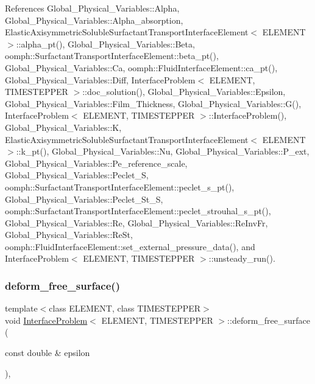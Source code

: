 References Global\+\_\+\+Physical\+\_\+\+Variables\+::\+Alpha, Global\+\_\+\+Physical\+\_\+\+Variables\+::\+Alpha\+\_\+absorption, Elastic\+Axisymmetric\+Soluble\+Surfactant\+Transport\+Interface\+Element$<$ E\+L\+E\+M\+E\+N\+T $>$\+::alpha\+\_\+pt(), Global\+\_\+\+Physical\+\_\+\+Variables\+::\+Beta, oomph\+::\+Surfactant\+Transport\+Interface\+Element\+::beta\+\_\+pt(), Global\+\_\+\+Physical\+\_\+\+Variables\+::\+Ca, oomph\+::\+Fluid\+Interface\+Element\+::ca\+\_\+pt(), Global\+\_\+\+Physical\+\_\+\+Variables\+::\+Diff, Interface\+Problem$<$ E\+L\+E\+M\+E\+N\+T, T\+I\+M\+E\+S\+T\+E\+P\+P\+E\+R $>$\+::doc\+\_\+solution(), Global\+\_\+\+Physical\+\_\+\+Variables\+::\+Epsilon, Global\+\_\+\+Physical\+\_\+\+Variables\+::\+Film\+\_\+\+Thickness, Global\+\_\+\+Physical\+\_\+\+Variables\+::\+G(), Interface\+Problem$<$ E\+L\+E\+M\+E\+N\+T, T\+I\+M\+E\+S\+T\+E\+P\+P\+E\+R $>$\+::\+Interface\+Problem(), Global\+\_\+\+Physical\+\_\+\+Variables\+::K, Elastic\+Axisymmetric\+Soluble\+Surfactant\+Transport\+Interface\+Element$<$ E\+L\+E\+M\+E\+N\+T $>$\+::k\+\_\+pt(), Global\+\_\+\+Physical\+\_\+\+Variables\+::\+Nu, Global\+\_\+\+Physical\+\_\+\+Variables\+::\+P\+\_\+ext, Global\+\_\+\+Physical\+\_\+\+Variables\+::\+Pe\+\_\+reference\+\_\+scale, Global\+\_\+\+Physical\+\_\+\+Variables\+::\+Peclet\+\_\+S, oomph\+::\+Surfactant\+Transport\+Interface\+Element\+::peclet\+\_\+s\+\_\+pt(), Global\+\_\+\+Physical\+\_\+\+Variables\+::\+Peclet\+\_\+\+St\+\_\+S, oomph\+::\+Surfactant\+Transport\+Interface\+Element\+::peclet\+\_\+strouhal\+\_\+s\+\_\+pt(), Global\+\_\+\+Physical\+\_\+\+Variables\+::\+Re, Global\+\_\+\+Physical\+\_\+\+Variables\+::\+Re\+Inv\+Fr, Global\+\_\+\+Physical\+\_\+\+Variables\+::\+Re\+St, oomph\+::\+Fluid\+Interface\+Element\+::set\+\_\+external\+\_\+pressure\+\_\+data(), and Interface\+Problem$<$ E\+L\+E\+M\+E\+N\+T, T\+I\+M\+E\+S\+T\+E\+P\+P\+E\+R $>$\+::unsteady\+\_\+run().

\mbox{\label{classInterfaceProblem_a4514af9aa19dd50d10ca18f12039428f}} 
\subsubsection{\texorpdfstring{deform\+\_\+free\+\_\+surface()}{deform\_free\_surface()}\hspace{0.1cm}{\footnotesize\ttfamily [2/2]}}
{\footnotesize\ttfamily template$<$class E\+L\+E\+M\+E\+NT, class T\+I\+M\+E\+S\+T\+E\+P\+P\+ER$>$ \\
void \hyperlink{classInterfaceProblem}{Interface\+Problem}$<$ E\+L\+E\+M\+E\+NT, T\+I\+M\+E\+S\+T\+E\+P\+P\+ER $>$\+::deform\+\_\+free\+\_\+surface (\begin{DoxyParamCaption}\item[{const double \&}]{epsilon }\end{DoxyParamCaption})\hspace{0.3cm}{\ttfamily [inline]}, {\ttfamily [private]}}



